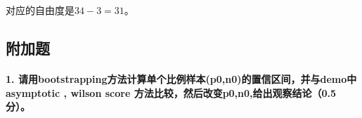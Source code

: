 \documentclass[11pt]{article}
\begin{document}
    对应的自由度是\(34-3=31\)。

    \hypertarget{ux9644ux52a0ux9898}{%
\subsection{附加题}\label{ux9644ux52a0ux9898}}

\hypertarget{ux8bf7ux7528bootstrappingux65b9ux6cd5ux8ba1ux7b97ux5355ux4e2aux6bd4ux4f8bux6837ux672cp0n0ux7684ux7f6eux4fe1ux533aux95f4ux5e76ux4e0edemoux4e2dasymptotic-wilson-score-ux65b9ux6cd5ux6bd4ux8f83ux7136ux540eux6539ux53d8p0n0ux7ed9ux51faux89c2ux5bdfux7ed3ux8bba0.5ux5206}{%
\paragraph{1.
请用bootstrapping方法计算单个比例样本(p0,n0)的置信区间，并与demo中asymptotic
, wilson score
方法比较，然后改变p0,n0,给出观察结论（0.5分）。}\label{ux8bf7ux7528bootstrappingux65b9ux6cd5ux8ba1ux7b97ux5355ux4e2aux6bd4ux4f8bux6837ux672cp0n0ux7684ux7f6eux4fe1ux533aux95f4ux5e76ux4e0edemoux4e2dasymptotic-wilson-score-ux65b9ux6cd5ux6bd4ux8f83ux7136ux540eux6539ux53d8p0n0ux7ed9ux51faux89c2ux5bdfux7ed3ux8bba0.5ux5206}}
\end{document}
